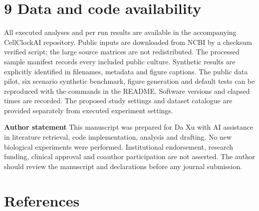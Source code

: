 \documentclass[
  11pt,
  letterpaper,
]{article}
\begin{document}
\hypertarget{data-and-code-availability}{%
\section{9 Data and code
availability}\label{data-and-code-availability}}

All executed analyses and per run results are available in the
accompanying CellClockAI repository. Public inputs are downloaded from
NCBI by a checksum verified script; the large source matrices are not
redistributed. The processed sample manifest records every included
public culture. Synthetic results are explicitly identified in
filenames, metadata and figure captions. The public data pilot, six
scenario synthetic benchmark, figure generation and default tests can be
reproduced with the commands in the README. Software versions and
elapsed times are recorded. The proposed study settings and dataset
catalogue are provided separately from executed experiment settings.

\textbf{Author statement} This manuscript was prepared for Da Xu with AI
assistance in literature retrieval, code implementation, analysis and
drafting. No new biological experiments were performed. Institutional
endorsement, research funding, clinical approval and coauthor
participation are not asserted. The author should review the manuscript
and declarations before any journal submission.

\hypertarget{references}{%
\section{References}\label{references}}
\end{document}
